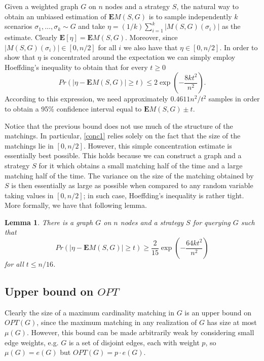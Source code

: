 \documentclass[12pt]{article}
\newtheorem{lemma}{Lemma}
\newcommand{\E}[1]{\mathbf{E}\left[#1\right]}
\newcommand{\Mf}[2]{M(#1,#2)}
\newcommand{\EMf}[2]{\mathbf{E}M(#1,#2)}
\begin{document}
		Given a weighted graph $G$ on $n$ nodes and a strategy $S$, the natural way to obtain an unbiased estimation of $\EMf{S}{G}$ is to sample independently $k$ scenarios $\sigma_1, \ldots, \sigma_k \sim G$ and take $\eta = (1/k) \sum_{i = 1}^k |\Mf{S}{G}(\sigma_i)|$ as the estimate. Clearly $\E{\eta} = \EMf{S}{G}$. Moreover, since $|\Mf{S}{G}(\sigma_i)| \in [0, n/2]$ for all $i$ we also have that $\eta \in [0, n/2]$. In order to show that $\eta$ is concentrated around the expectation we can simply employ Hoeffding's inequality to obtain that for every $t \ge 0$
\begin{equation}
		 	Pr\left(|\eta - \EMf{S}{G}| \ge t\right) \le 2 \exp\left( -\frac{8 k t^2}{n^2} \right). \label{conc1}
		 \end{equation}
	According to this expression, we need approximately $0.4611 n^2 / t^2$ samples in order to obtain a 95\% confidence interval equal to $\EMf{S}{G} \pm t$. 
	
	Notice that the previous bound does not use much of the structure of the matchings. In particular, \eqref{conc1} relies solely on the fact that the size of the matchings lie in $[0, n/2]$. However, this simple concentration estimate is essentially best possible. This holds because we can construct a graph and a strategy $S$ for it which obtains a small matching half of the time and a large matching half of the time. The variance on the size of the matching obtained by $S$ is then essentially as large as possible when compared to any random variable taking values in $[0, n/2]$; in such case, Hoeffding's inequality is rather tight. More formally, we have that following lemma.
	
	\begin{lemma} \label{tightSampling}
		There is a graph $G$ on $n$ nodes and a strategy $S$ for querying $G$ such that
\begin{equation*}
			Pr\left(\left|\eta - \EMf{S}{G}\right| \ge t\right) \ge \frac{2}{15} \exp\left( -\frac{64 k t^2}{n^2} \right)
		\end{equation*}
		for all $t \le n/16$.
	\end{lemma}
			
	\subsection{Upper bound on $OPT$} \label{secUB}
		
		Clearly the size of a maximum cardinality matching in $G$ is an upper bound on $OPT(G)$, since the maximum matching in any realization of $G$ has size at most $\mu(G)$.
However, this bound can be made arbitrarily weak by considering small edge weights, e.g. $G$ is a set of disjoint edges, each with weight $p$, so $\mu(G) = e(G)$ but $OPT(G) = p \cdot e(G)$. 
		
\end{document}
